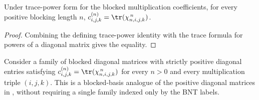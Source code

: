\begin{lemma}%
    \label{lem:mpdo_blocked_structure_chi_eq_trace_matrix_pow}
    \leanok
    Under trace-power form for the blocked multiplication coefficients,
    for every positive blocking length $n$,
    $c^{(n)}_{i,j,k}=\tr(\chi_{n,i,j,k}^{\,n})$.
\end{lemma}
\begin{proof}\leanok
    Combining the defining trace-power identity with the trace formula for
    powers of a diagonal matrix gives the equality.
\end{proof}

\begin{definition}%
    \label{def:mpdo_positive_blocked_structure_chi_trace_power_form}
    \leanok
    Consider a family of blocked diagonal matrices with strictly positive
    diagonal entries satisfying
    $c^{(n)}_{i,j,k}=\tr(\chi_{n,i,j,k}^{\,n})$ for every $n>0$ and every
    multiplication triple $(i,j,k)$. This is a blocked-basis analogue of the
    positive diagonal matrices in
    \cite[Theorem~4.14(ii)]{Cirac2016MPDO_arXiv}, without requiring a single
    family indexed only by the BNT labels.
\end{definition}

